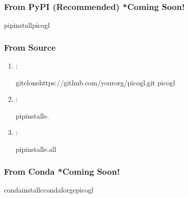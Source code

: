 \documentclass[a4paper,10pt,english,openany,oneside]{sphinxmanual}
\begin{document}
\subsubsection{From PyPI (Recommended) {\color{red}\bfseries{}*}Coming Soon!}
\label{\detokenize{installation:from-pypi-recommended-coming-soon}}
\begin{sphinxVerbatim}[commandchars=\\\{\}]
pipinstallpicogl
\end{sphinxVerbatim}


\subsubsection{From Source}
\label{\detokenize{installation:from-source}}\begin{enumerate}
%
\item {} 
\sphinxAtStartPar
{}:

\begin{sphinxVerbatim}[commandchars=\\\{\}]
gitclonehttps://github.com/your\PYGZhy{}org/picogl.git
picogl
\end{sphinxVerbatim}

\item {} 
\sphinxAtStartPar
{}:

\begin{sphinxVerbatim}[commandchars=\\\{\}]
pipinstall\PYGZhy{}e.
\end{sphinxVerbatim}

\item {} 
\sphinxAtStartPar
{}:

\begin{sphinxVerbatim}[commandchars=\\\{\}]
pipinstall\PYGZhy{}e.\PYG{o}{[}all\PYG{o}{]}
\end{sphinxVerbatim}

\end{enumerate}


\subsubsection{From Conda {\color{red}\bfseries{}*}Coming Soon!}
\label{\detokenize{installation:from-conda-coming-soon}}
\begin{sphinxVerbatim}[commandchars=\\\{\}]
condainstall\PYGZhy{}cconda\PYGZhy{}forgepicogl
\end{sphinxVerbatim}
\end{document}
